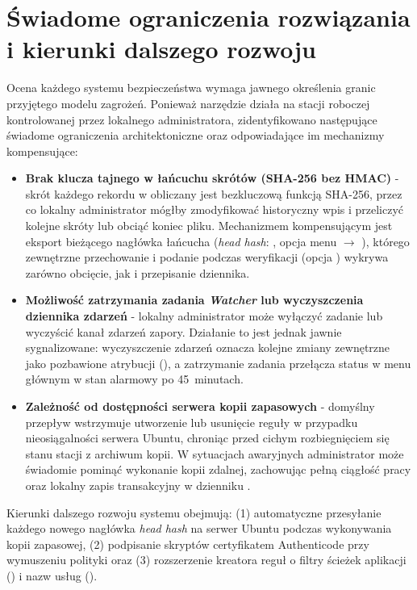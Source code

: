 \section{Świadome ograniczenia rozwiązania i kierunki dalszego rozwoju}\label{sec:dalsze-prace}

Ocena każdego systemu bezpieczeństwa wymaga jawnego określenia granic przyjętego modelu zagrożeń. Ponieważ narzędzie działa na stacji roboczej kontrolowanej przez lokalnego administratora, zidentyfikowano następujące świadome ograniczenia architektoniczne oraz odpowiadające im mechanizmy kompensujące:

\begin{itemize}
    \item \textbf{Brak klucza tajnego w łańcuchu skrótów (SHA-256 bez HMAC)} - skrót każdego rekordu w  obliczany jest bezkluczową funkcją SHA-256, przez co lokalny administrator mógłby zmodyfikować historyczny wpis i przeliczyć kolejne skróty lub obciąć koniec pliku. Mechanizmem kompensującym jest eksport bieżącego nagłówka łańcucha (\textit{head hash}: , opcja menu  $\rightarrow$ \code{[H]}), którego zewnętrzne przechowanie i podanie podczas weryfikacji (opcja ) wykrywa zarówno obcięcie, jak i przepisanie dziennika.
    \item \textbf{Możliwość zatrzymania zadania \textit{Watcher} lub wyczyszczenia dziennika zdarzeń} - lokalny administrator może wyłączyć zadanie \code{\FirewallAudit\Watcher} lub wyczyścić kanał zdarzeń zapory. Działanie to jest jednak jawnie sygnalizowane: wyczyszczenie zdarzeń oznacza kolejne zmiany zewnętrzne jako pozbawione atrybucji (), a zatrzymanie zadania przełącza status w menu głównym w stan alarmowy  po 45~minutach.
    \item \textbf{Zależność od dostępności serwera kopii zapasowych} - domyślny przepływ wstrzymuje utworzenie lub usunięcie reguły w przypadku nieosiągalności serwera Ubuntu, chroniąc przed cichym rozbiegnięciem się stanu stacji z archiwum kopii. W sytuacjach awaryjnych administrator może świadomie pominąć wykonanie kopii zdalnej, zachowując pełną ciągłość pracy oraz lokalny zapis transakcyjny w dzienniku .
\end{itemize}

Kierunki dalszego rozwoju systemu obejmują: (1) automatyczne przesyłanie każdego nowego nagłówka \textit{head hash} na serwer Ubuntu podczas wykonywania kopii zapasowej, (2) podpisanie skryptów certyfikatem Authenticode przy wymuszeniu polityki  oraz (3) rozszerzenie kreatora reguł o filtry ścieżek aplikacji () i nazw usług ().

